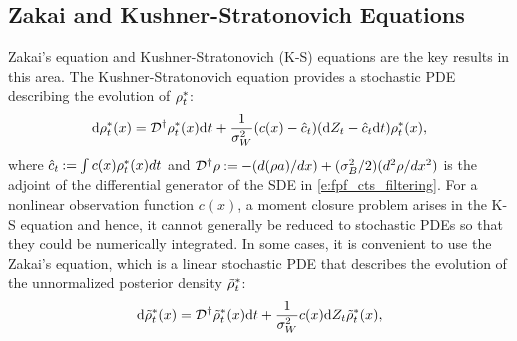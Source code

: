 \subsection{Zakai and Kushner-Stratonovich Equations}
Zakai's equation \cite{zak69} and Kushner-Stratonovich (K-S) \cite{kus67, str60} equations are the key results in this area. 
The Kushner-Stratonovich equation provides a stochastic PDE describing the evolution of $\rho^*_t$:
\begin{equation}
\ud \pr^*_t(x) = \generate^\dagger \pr^*_t(x) \ud t + \frac{1}{\sigma^2_W} (c(x) - \hat{c}_t) (\ud Z_t - \hat{c}_t\ud t) \pr^*_t(x),
\label{e:fpf_kushner_stratonovich}
\end{equation}
where ${\hat c}_t \mathbin{:=} \int c(x) \rho^*_t(x) dt$ and ${\cal D}^\dagger \rho \mathbin{:=} - (d(\rho a) / dx) + (\sigma^2_B/2) (d^2 \rho /d x^2)$ is the adjoint of the differential generator of the SDE in \eqref{e:fpf_cts_filtering}. 
For a nonlinear observation function $c(x)$, a moment closure problem arises in the K-S equation and hence, it cannot generally be reduced to stochastic PDEs so that they could be numerically integrated. In some cases, it is convenient to use the Zakai's equation, which is a linear stochastic PDE that describes the evolution of the unnormalized posterior density $\tilde{\rho}^*_t$: 
\begin{equation}
\ud \tilde{\pr}^*_t(x) = \generate^\dagger \tilde{\pr}^*_t(x) \ud t + \frac{1}{\sigma^2_W}  c(x) \ud Z_t \tilde{\pr}^*_t(x), 
\label{e:fpf_zakai}
\end{equation}

